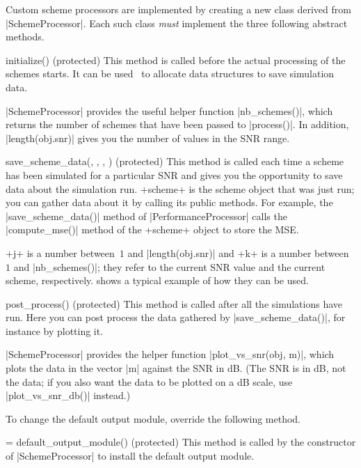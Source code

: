 Custom scheme processors are implemented by creating a new class derived from
|SchemeProcessor|. Each such class \emph{must} implement the three following
abstract methods.

\begin{method}{initialize(\obj) (protected)}
  This method is called before the actual processing of the schemes starts. It
  can be used \eg\ to allocate data structures to save simulation data.

  |SchemeProcessor| provides the useful helper function |nb_schemes()|, which
  returns the number of schemes that have been passed to |process()|. In
  addition, |length(obj.snr)| gives you the number of values in the SNR range.
\end{method}

\begin{method}{save_scheme_data(\obj, , , )
  (protected)}
  This method is called each time a scheme has been simulated for a particular
  SNR and gives you the opportunity to save data about the simulation run.
  +scheme+ is the scheme object that was just run; you can gather data about it
  by calling its public methods. For example, the |save_scheme_data()| method
  of |PerformanceProcessor| calls the |compute_mse()| method of the +scheme+
  object to store the MSE.

  +j+ is a number between~$1$ and |length(obj.snr)| and +k+ is a number
  between~$1$ and |nb_schemes()|; they refer to the current SNR value and the
  current scheme, respectively.  shows a typical example of how
  they can be used.
\end{method}

\begin{method}{post_process(\obj) (protected)}
  This method is called after all the simulations have run. Here you can post
  process the data gathered by |save_scheme_data()|, for instance by plotting
  it.

  |SchemeProcessor| provides the helper function |plot_vs_snr(obj, m)|, which
  plots the data in the vector |m| against the SNR in dB. (The SNR is in dB, not
  the data; if you also want the data to be plotted on a dB scale, use
  |plot_vs_snr_db()| instead.)
\end{method}

To change the default output module, override the following method.
\begin{method}{ = default_output_module(\obj) (protected)}
  This method is called by the constructor of |SchemeProcessor| to install the
  default output module. 
\end{method}


